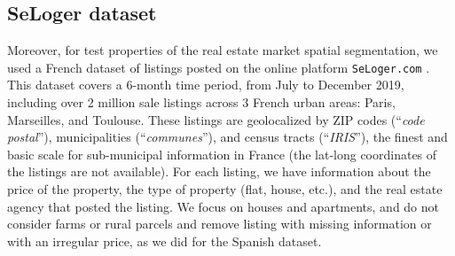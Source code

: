 \subsection{\label{subsec:SeLoger dataset} SeLoger dataset}

Moreover, for test properties of the real estate market spatial segmentation, we used a French dataset of listings posted on the online platform \texttt{SeLoger.com} \cite{SeLoger}. This dataset covers a 6-month time period, from July to December 2019, including over 2 million sale listings across 3 French urban areas: Paris, Marseilles, and Toulouse. These listings are geolocalized by ZIP codes (``\textit{code postal}''), municipalities (``\textit{communes}''), and census tracts (``\textit{IRIS}''), the finest and basic scale for sub-municipal information in France (the lat-long coordinates of the listings are not available). For each listing, we have information about the price of the property, the type of property (flat, house, etc.), and the real estate agency that posted the listing. We focus on houses and apartments, and do not consider farms or rural parcels and remove listing with missing information or with an irregular price, as we did for the Spanish dataset.